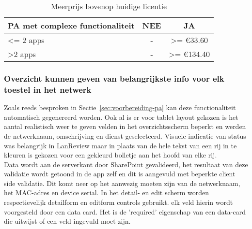 \begin{table}[h!]
    \begin{tabular}{|l|c|c|}
        \hline
        \textbf{PA met complexe functionaliteit} & \textbf{NEE} & \textbf{JA}             \\ \hline
        \textless{}= 2 apps                      & -            & \textgreater{}= \euro 33.60  \\ \hline
        \textgreater 2 apps                      & -            & \textgreater{}= \euro 134.40 \\ \hline
    \end{tabular}
    \caption{Meerprijs bovenop huidige licentie}
\end{table}

\subsubsection{Overzicht kunnen geven van belangrijkste info voor elk toestel in het netwerk}

Zoals reeds besproken in Sectie~\ref{sec:voorbereiding-pa} kan deze functionaliteit automatisch gegenereerd worden. Ook al is er voor tablet layout gekozen is het aantal realistisch weer te geven velden in het overzichtsscherm beperkt en werden de netwerknaam, omschrijving en dienst geselecteerd. Visuele indicatie van status was belangrijk in LanReview maar in plaats van de hele tekst van een rij in te kleuren is gekozen voor een gekleurd bolletje aan het hoofd van elke rij.\\
Data wordt aan de serverkant door SharePoint gevalideerd, het resultaat van deze validatie wordt getoond in de app zelf en dit is aangevuld met beperkte client side validatie. Dit komt neer op het aanwezig moeten zijn van de netwerknaam, het MAC-adres en device serial. In het detail- en edit scherm worden respectievelijk detailform en editform controls gebruikt. elk veld hierin wordt voorgesteld door een data card. Het is de 'required' eigenschap van een data-card die uitwijst of een veld ingevuld moet zijn.


